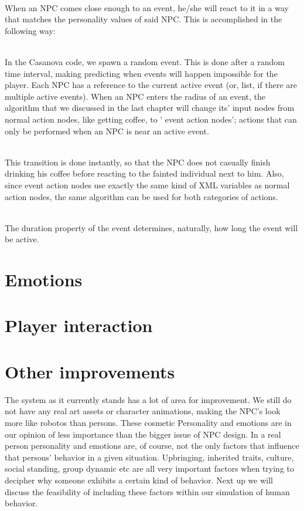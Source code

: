 \documentclass[11pt]{article} %
\begin{document}
~\\
When an NPC comes close enough to an event, he/she will react to it in a way that matches the personality values of said NPC. This is accomplished in the following way:

~\\
In the Casanova code, we spawn a random event. This is done after a random time interval, making predicting when events will happen impossible for the player. Each NPC has a reference to the current active event (or, list, if there are multiple active events). When an NPC enters the radius of an event, the algorithm that we discussed in the last chapter will change its' input nodes from normal action nodes, like getting coffee, to ' event action nodes'; actions that can only be performed when an NPC is near an active event.

~\\
This transition is done instantly, so that the NPC does not casually finish drinking his coffee before reacting to the fainted individual next to him. Also, since event action nodes use exactly the same kind of XML variables as normal action nodes, the same algorithm can be used for both categories of actions. 

~\\
The duration property of the event determines, naturally, how long the event will be active.  

\newpage
\section{Emotions}

\newpage
\section{Player interaction}



\newpage
\section{Other improvements}
The system as it currently stands has a lot of area for improvement. We still do not have any real art assets or character animations, making the NPC's look more like robotos than persons. These cosmetic Personality and emotions are in our opinion of less importance than the bigger issue of NPC design. In a real person personality and emotions are, of course, not the only factors that influence that persons' behavior in a given situation. Upbringing, inherited traits, culture, social standing, group dynamic etc are all very important factors when trying to decipher why someone exhibits a certain kind of behavior. Next up we will discuss the feasibility of including these factors within our simulation of human behavior.%
\end{document}
